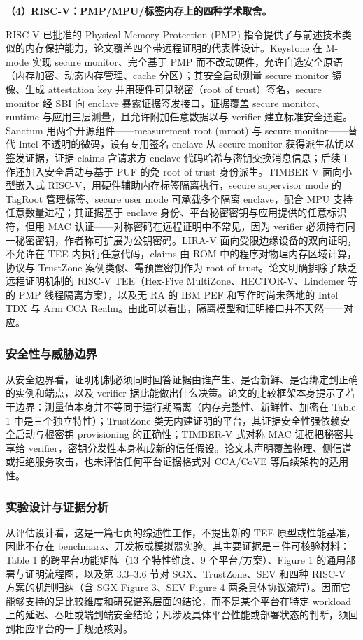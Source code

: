 \documentclass[11pt]{ctexart}
\begin{document}
\noindent\textbf{（4）RISC-V：PMP/MPU/标签内存上的四种学术取舍。}\par
RISC-V 已批准的 Physical Memory Protection (PMP) 指令提供了与前述技术类似的内存保护能力，论文覆盖四个带远程证明的代表性设计。Keystone 在 M-mode 实现 secure monitor、完全基于 PMP 而不改动硬件，允许自选安全原语（内存加密、动态内存管理、cache 分区）；其安全启动测量 secure monitor 镜像、生成 attestation key 并用硬件可见秘密（root of trust）签名，secure monitor 经 SBI 向 enclave 暴露证据签发接口，证据覆盖 secure monitor、runtime 与应用三层测量，且允许附加任意数据以与 verifier 建立标准安全通道。Sanctum 用两个开源组件——measurement root (mroot) 与 secure monitor——替代 Intel 不透明的微码，设有专用签名 enclave 从 secure monitor 获得派生私钥以签发证据，证据 claims 含请求方 enclave 代码哈希与密钥交换消息信息；后续工作还加入安全启动与基于 PUF 的免 root of trust 身份派生。TIMBER-V 面向小型嵌入式 RISC-V，用硬件辅助内存标签隔离执行，secure supervisor mode 的 TagRoot 管理标签、secure user mode 可承载多个隔离 enclave，配合 MPU 支持任意数量进程；其证据基于 enclave 身份、平台秘密密钥与应用提供的任意标识符，但用 MAC 认证——对称密码在远程证明中不常见，因为 verifier 必须持有同一秘密密钥，作者称可扩展为公钥密码。LIRA-V 面向受限边缘设备的双向证明，不允许在 TEE 内执行任意代码，claims 由 ROM 中的程序对物理内存区域计算，协议与 TrustZone 案例类似、需预置密钥作为 root of trust。论文明确排除了缺乏远程证明机制的 RISC-V TEE（Hex-Five MultiZone、HECTOR-V、Lindemer 等的 PMP 线程隔离方案），以及无 RA 的 IBM PEF 和写作时尚未落地的 Intel TDX 与 Arm CCA Realm。由此可以看出，隔离模型和证明接口并不天然一一对应。\par
\subsubsection{安全性与威胁边界}
从安全边界看，证明机制必须同时回答证据由谁产生、是否新鲜、是否绑定到正确的实例和端点，以及 verifier 据此能做出什么决策。论文的比较框架本身提示了若干边界：测量值本身并不等同于运行期隔离（内存完整性、新鲜性、加密在 Table 1 中是三个独立特性）；TrustZone 类无内建证明的平台，其证据安全性强依赖安全启动与根密钥 provisioning 的正确性；TIMBER-V 式对称 MAC 证据把秘密共享给 verifier，密钥分发性本身构成新的信任假设。论文未声明覆盖物理、侧信道或拒绝服务攻击，也未评估任何平台证据格式对 CCA/CoVE 等后续架构的适用性。\par
\subsubsection{实验设计与证据分析}
从评估设计看，这是一篇七页的综述性工作，不提出新的 TEE 原型或性能基准，因此不存在 benchmark、开发板或模拟器实验。其主要证据是三件可核验材料：Table 1 的跨平台功能矩阵（13 个特性维度、9 个平台/方案）、Figure 1 的通用部署与证明流程图，以及第 3.3–3.6 节对 SGX、TrustZone、SEV 和四种 RISC-V 方案的机制归纳（含 SGX Figure 3、SEV Figure 4 两条具体协议流程）。因而它能够支持的是比较维度和研究谱系层面的结论，而不是某个平台在特定 workload 上的延迟、吞吐或端到端安全结论；凡涉及具体平台性能或部署状态的判断，须回到相应平台的一手规范核对。\par
\end{document}
